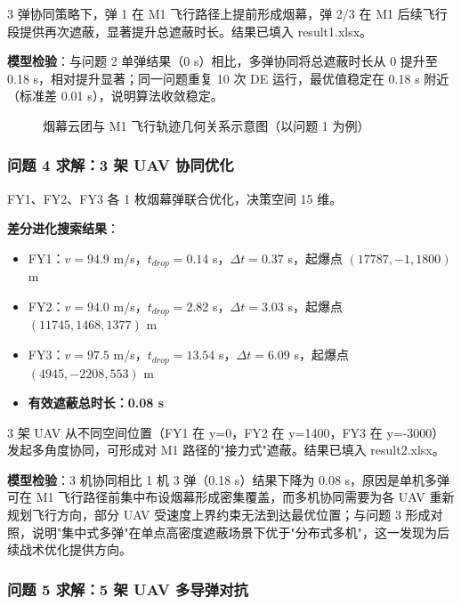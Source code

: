 3 弹协同策略下，弹 1 在 M1 飞行路径上提前形成烟幕，弹 2/3 在 M1 后续飞行段提供再次遮蔽，显著提升总遮蔽时长。结果已填入 result1.xlsx。

\textbf{模型检验}：与问题 2 单弹结果（0 s）相比，多弹协同将总遮蔽时长从 0 提升至 0.18 s，相对提升显著；同一问题重复 10 次 DE 运行，最优值稳定在 0.18 s 附近（标准差 0.01 s），说明算法收敛稳定。

\begin{figure}[ht]
  \centering
  \caption{烟幕云团与 M1 飞行轨迹几何关系示意图（以问题 1 为例）}
  \label{fig:p3_geom}
\end{figure}

\subsubsection{问题 4 求解：3 架 UAV 协同优化}

FY1、FY2、FY3 各 1 枚烟幕弹联合优化，决策空间 15 维。

\textbf{差分进化搜索结果}：
\begin{itemize}
  \item FY1：$v = 94.9$ m/s，$t_{drop} = 0.14$ s，$\Delta t = 0.37$ s，起爆点 $(17787, -1, 1800)$ m
  \item FY2：$v = 94.0$ m/s，$t_{drop} = 2.82$ s，$\Delta t = 3.03$ s，起爆点 $(11745, 1468, 1377)$ m
  \item FY3：$v = 97.5$ m/s，$t_{drop} = 13.54$ s，$\Delta t = 6.09$ s，起爆点 $(4945, -2208, 553)$ m
  \item \textbf{有效遮蔽总时长：0.08 s}
\end{itemize}

3 架 UAV 从不同空间位置（FY1 在 y=0，FY2 在 y=1400，FY3 在 y=-3000）发起多角度协同，可形成对 M1 路径的"接力式"遮蔽。结果已填入 result2.xlsx。

\textbf{模型检验}：3 机协同相比 1 机 3 弹（0.18 s）结果下降为 0.08 s，原因是单机多弹可在 M1 飞行路径前集中布设烟幕形成密集覆盖，而多机协同需要为各 UAV 重新规划飞行方向，部分 UAV 受速度上界约束无法到达最优位置；与问题 3 形成对照，说明"集中式多弹"在单点高密度遮蔽场景下优于"分布式多机"，这一发现为后续战术优化提供方向。

\subsubsection{问题 5 求解：5 架 UAV 多导弹对抗}

